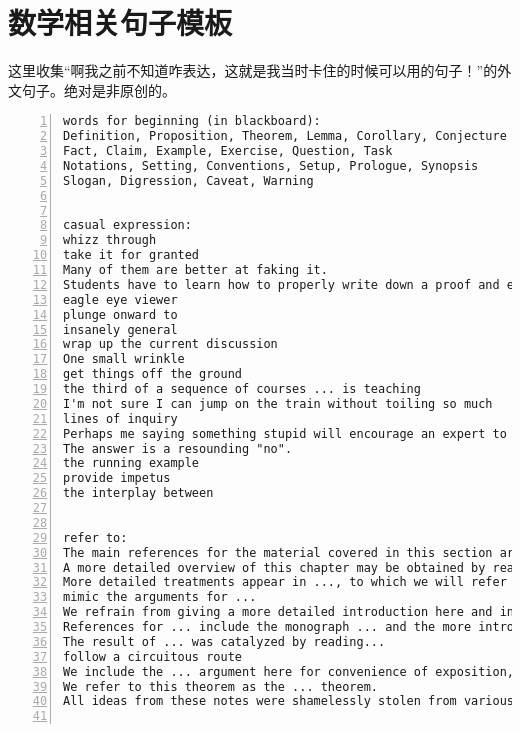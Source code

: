 \documentclass[11pt]{amsart}
\begin{document}
\section{数学相关句子模板}
这里收集“啊我之前不知道咋表达，这就是我当时卡住的时候可以用的句子！”的外文句子。绝对是非原创的。
\begin{lstlisting}[numbers=left,numberstyle=\tiny,numbersep=10pt]
words for beginning (in blackboard):
Definition, Proposition, Theorem, Lemma, Corollary, Conjecture
Fact, Claim, Example, Exercise, Question, Task
Notations, Setting, Conventions, Setup, Prologue, Synopsis
Slogan, Digression, Caveat, Warning


casual expression:
whizz through
take it for granted
Many of them are better at faking it.
Students have to learn how to properly write down a proof and everything. So one has to do important pedagogical work and teach them, how to do this.
eagle eye viewer
plunge onward to
insanely general
wrap up the current discussion
One small wrinkle
get things off the ground
the third of a sequence of courses ... is teaching
I'm not sure I can jump on the train without toiling so much
lines of inquiry
Perhaps me saying something stupid will encourage an expert to weigh in
The answer is a resounding "no".
the running example
provide impetus
the interplay between


refer to:
The main references for the material covered in this section are ...
A more detailed overview of this chapter may be obtained by reading the introductions to the various sections.
More detailed treatments appear in ..., to which we will refer for proofs.
mimic the arguments for ...
We refrain from giving a more detailed introduction here and instead refer the reader to the table of contents as well as to the short introductions of the individual sections.
References for ... include the monograph ... and the more introductory account ...
The result of ... was catalyzed by reading...
follow a circuitous route
We include the ... argument here for convenience of exposition, and because the comparison with their constructions is interesting in its own right.
We refer to this theorem as the ... theorem.
All ideas from these notes were shamelessly stolen from various lecture notes in the literature. I mention a few:


\end{lstlisting}
\end{document}
